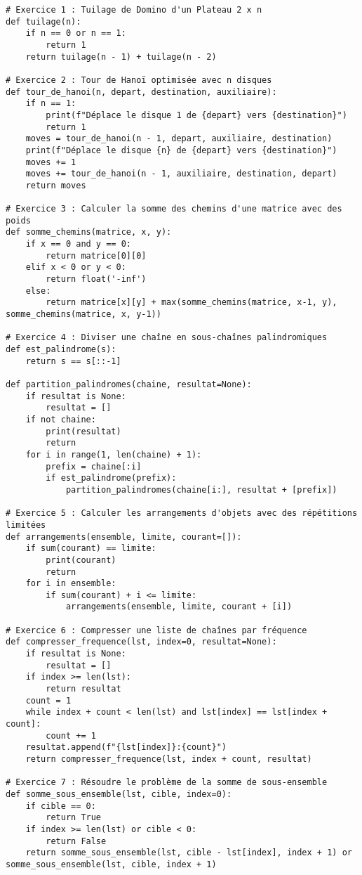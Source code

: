 \begin{lstlisting}
# Exercice 1 : Tuilage de Domino d'un Plateau 2 x n
def tuilage(n):
    if n == 0 or n == 1:
        return 1
    return tuilage(n - 1) + tuilage(n - 2)
    
# Exercice 2 : Tour de Hanoï optimisée avec n disques
def tour_de_hanoi(n, depart, destination, auxiliaire):
    if n == 1:
        print(f"Déplace le disque 1 de {depart} vers {destination}")
        return 1
    moves = tour_de_hanoi(n - 1, depart, auxiliaire, destination)
    print(f"Déplace le disque {n} de {depart} vers {destination}")
    moves += 1
    moves += tour_de_hanoi(n - 1, auxiliaire, destination, depart)
    return moves

# Exercice 3 : Calculer la somme des chemins d'une matrice avec des poids
def somme_chemins(matrice, x, y):
    if x == 0 and y == 0:
        return matrice[0][0]
    elif x < 0 or y < 0:
        return float('-inf')
    else:
        return matrice[x][y] + max(somme_chemins(matrice, x-1, y), somme_chemins(matrice, x, y-1))

# Exercice 4 : Diviser une chaîne en sous-chaînes palindromiques
def est_palindrome(s):
    return s == s[::-1]

def partition_palindromes(chaine, resultat=None):
    if resultat is None:
        resultat = []
    if not chaine:
        print(resultat)
        return
    for i in range(1, len(chaine) + 1):
        prefix = chaine[:i]
        if est_palindrome(prefix):
            partition_palindromes(chaine[i:], resultat + [prefix])

# Exercice 5 : Calculer les arrangements d'objets avec des répétitions limitées
def arrangements(ensemble, limite, courant=[]):
    if sum(courant) == limite:
        print(courant)
        return
    for i in ensemble:
        if sum(courant) + i <= limite:
            arrangements(ensemble, limite, courant + [i])

# Exercice 6 : Compresser une liste de chaînes par fréquence
def compresser_frequence(lst, index=0, resultat=None):
    if resultat is None:
        resultat = []
    if index >= len(lst):
        return resultat
    count = 1
    while index + count < len(lst) and lst[index] == lst[index + count]:
        count += 1
    resultat.append(f"{lst[index]}:{count}")
    return compresser_frequence(lst, index + count, resultat)

# Exercice 7 : Résoudre le problème de la somme de sous-ensemble
def somme_sous_ensemble(lst, cible, index=0):
    if cible == 0:
        return True
    if index >= len(lst) or cible < 0:
        return False
    return somme_sous_ensemble(lst, cible - lst[index], index + 1) or somme_sous_ensemble(lst, cible, index + 1)


\end{lstlisting}
